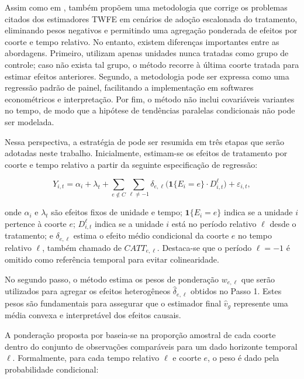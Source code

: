 \documentclass[12pt,a4paper,oneside]{article}
\begin{document}
		Assim como em \citet{Callaway2021}, \citet{Sun2021} também propõem uma metodologia que corrige os problemas citados dos estimadores TWFE em cenários de adoção escalonada do tratamento, eliminando pesos negativos e permitindo uma agregação ponderada de efeitos por coorte e tempo relativo. No entanto, existem diferenças importantes entre as abordagens. Primeiro, \citet{Sun2021} utilizam apenas unidades nunca tratadas como grupo de controle; caso não exista tal grupo, o método recorre à última coorte tratada para estimar efeitos anteriores. Segundo, a metodologia pode ser expressa como uma regressão padrão de painel, facilitando a implementação em softwares econométricos e interpretação. Por fim, o método não inclui covariáveis variantes no tempo, de modo que a hipótese de tendências paralelas condicionais não pode ser modelada.
		
		Nessa perspectiva, a estratégia de \citet{Sun2021} pode ser resumida em três etapas que serão adotadas neste trabalho. Inicialmente, estimam-se os efeitos de tratamento por coorte e tempo relativo a partir da seguinte especificação de regressão:
		
		\begin{equation}
			Y_{i,t} = \alpha_i + \lambda_t + \sum_{e \notin C} \sum_{\ell \neq -1} \delta_{e,\ell} \big( \mathbf{1}\{E_i = e\} \cdot D_{i,t}^\ell \big) + \varepsilon_{i,t},
		\end{equation}
		
		onde $\alpha_i$ e $\lambda_t$ são efeitos fixos de unidade e tempo; $\mathbf{1}\{E_i = e\}$ indica se a unidade $i$ pertence à coorte $e$; $D_{i,t}^\ell$ indica se a unidade $i$ está no período relativo $\ell$ desde o tratamento; e $\delta_{e,\ell}$ estima o efeito médio condicional da coorte $e$ no tempo relativo $\ell$, também chamado de $CATT_{e,\ell}$. Destaca-se que o período $\ell=-1$ é omitido como referência temporal para evitar colinearidade.
		
No segundo passo, o método estima os pesos de ponderação $w_{e,\ell}$ que serão utilizados para agregar os efeitos heterogêneos $\hat{\delta}_{e,\ell}$ obtidos no Passo 1. Estes pesos são fundamentais para assegurar que o estimador final $\hat{v}_g$ represente uma média convexa e interpretável dos efeitos causais.

A ponderação proposta por \citet{Sun2021} baseia-se na proporção amostral de cada coorte dentro do conjunto de observações comparáveis para um dado horizonte temporal $\ell$. Formalmente, para cada tempo relativo $\ell$ e coorte $e$, o peso é dado pela probabilidade condicional:
\end{document}
